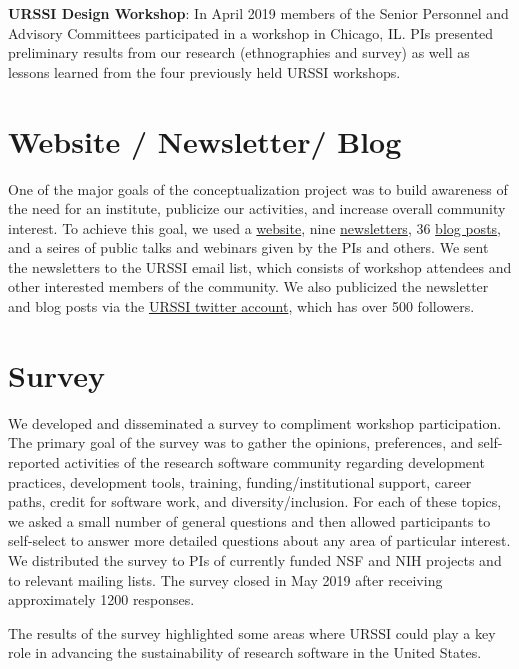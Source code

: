 \documentclass[
]{book}
\begin{document}
\textbf{URSSI Design Workshop}: In April 2019 members of the Senior Personnel
and Advisory Committees participated in a workshop in Chicago, IL. PIs
presented preliminary results from our research (ethnographies and survey)
as well as lessons learned from the four previously held URSSI workshops.

\hypertarget{website-newsletter-blog}{%
\section{Website / Newsletter/ Blog}\label{website-newsletter-blog}}

One of the major goals of the conceptualization project was to build awareness
of the need for an institute, publicize our activities, and increase overall community interest.
To achieve this goal, we used a \href{http://urssi.us}{website}, nine \href{http://urssi.us/newsletter/}{newsletters},
36 \href{http://urssi.us/blog/}{blog posts}, and a seires of public talks and webinars given
by the PIs and others. We sent the newsletters to the URSSI email list, which consists
of workshop attendees and other interested members of the community.
We also publicized the newsletter and blog posts via the \href{https://twitter.com/si2urssi/}{URSSI twitter account},
which has over 500 followers.

\hypertarget{survey}{%
\section{Survey}\label{survey}}

We developed and disseminated a survey to compliment workshop participation.
The primary goal of the survey was to gather the opinions, preferences, and
self-reported activities of the research software community regarding
development practices, development tools, training, funding/institutional
support, career paths, credit for software work, and diversity/inclusion.
For each of these topics, we asked a small number of general questions and
then allowed participants to self-select to answer more detailed questions
about any area of particular interest. We distributed the survey to PIs of
currently funded NSF and NIH projects and to relevant mailing lists. The
survey closed in May 2019 after receiving approximately 1200 responses.

The results of the survey highlighted some areas where URSSI could play a
key role in advancing the sustainability of research software in the United States.
\end{document}
